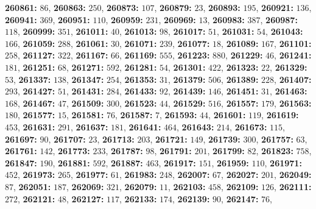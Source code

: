 \textsf{\bfseries 260861:} $86$, \textsf{\bfseries 260863:} $250$, \textsf{\bfseries 260873:} $107$, \textsf{\bfseries 260879:} $23$, \textsf{\bfseries 260893:} $195$, \textsf{\bfseries 260921:} $136$, \textsf{\bfseries 260941:} $369$, \textsf{\bfseries 260951:} $110$, \textsf{\bfseries 260959:} $231$, \textsf{\bfseries 260969:} $13$, \textsf{\bfseries 260983:} $387$, \textsf{\bfseries 260987:} $118$, \textsf{\bfseries 260999:} $351$, \textsf{\bfseries 261011:} $40$, \textsf{\bfseries 261013:} $98$, \textsf{\bfseries 261017:} $51$, \textsf{\bfseries 261031:} $54$, \textsf{\bfseries 261043:} $166$, \textsf{\bfseries 261059:} $288$, \textsf{\bfseries 261061:} $30$, \textsf{\bfseries 261071:} $239$, \textsf{\bfseries 261077:} $18$, \textsf{\bfseries 261089:} $167$, \textsf{\bfseries 261101:} $258$, \textsf{\bfseries 261127:} $322$, \textsf{\bfseries 261167:} $66$, \textsf{\bfseries 261169:} $555$, \textsf{\bfseries 261223:} $880$, \textsf{\bfseries 261229:} $46$, \textsf{\bfseries 261241:} $181$, \textsf{\bfseries 261251:} $68$, \textsf{\bfseries 261271:} $592$, \textsf{\bfseries 261281:} $54$, \textsf{\bfseries 261301:} $422$, \textsf{\bfseries 261323:} $22$, \textsf{\bfseries 261329:} $53$, \textsf{\bfseries 261337:} $138$, \textsf{\bfseries 261347:} $254$, \textsf{\bfseries 261353:} $31$, \textsf{\bfseries 261379:} $506$, \textsf{\bfseries 261389:} $228$, \textsf{\bfseries 261407:} $293$, \textsf{\bfseries 261427:} $51$, \textsf{\bfseries 261431:} $284$, \textsf{\bfseries 261433:} $92$, \textsf{\bfseries 261439:} $146$, \textsf{\bfseries 261451:} $31$, \textsf{\bfseries 261463:} $168$, \textsf{\bfseries 261467:} $47$, \textsf{\bfseries 261509:} $300$, \textsf{\bfseries 261523:} $44$, \textsf{\bfseries 261529:} $516$, \textsf{\bfseries 261557:} $179$, \textsf{\bfseries 261563:} $180$, \textsf{\bfseries 261577:} $15$, \textsf{\bfseries 261581:} $76$, \textsf{\bfseries 261587:} $7$, \textsf{\bfseries 261593:} $44$, \textsf{\bfseries 261601:} $119$, \textsf{\bfseries 261619:} $453$, \textsf{\bfseries 261631:} $291$, \textsf{\bfseries 261637:} $181$, \textsf{\bfseries 261641:} $464$, \textsf{\bfseries 261643:} $214$, \textsf{\bfseries 261673:} $115$, \textsf{\bfseries 261697:} $90$, \textsf{\bfseries 261707:} $23$, \textsf{\bfseries 261713:} $203$, \textsf{\bfseries 261721:} $149$, \textsf{\bfseries 261739:} $300$, \textsf{\bfseries 261757:} $63$, \textsf{\bfseries 261761:} $142$, \textsf{\bfseries 261773:} $233$, \textsf{\bfseries 261787:} $98$, \textsf{\bfseries 261791:} $201$, \textsf{\bfseries 261799:} $82$, \textsf{\bfseries 261823:} $758$, \textsf{\bfseries 261847:} $190$, \textsf{\bfseries 261881:} $592$, \textsf{\bfseries 261887:} $463$, \textsf{\bfseries 261917:} $151$, \textsf{\bfseries 261959:} $110$, \textsf{\bfseries 261971:} $452$, \textsf{\bfseries 261973:} $265$, \textsf{\bfseries 261977:} $61$, \textsf{\bfseries 261983:} $248$, \textsf{\bfseries 262007:} $67$, \textsf{\bfseries 262027:} $201$, \textsf{\bfseries 262049:} $87$, \textsf{\bfseries 262051:} $187$, \textsf{\bfseries 262069:} $321$, \textsf{\bfseries 262079:} $11$, \textsf{\bfseries 262103:} $458$, \textsf{\bfseries 262109:} $126$, \textsf{\bfseries 262111:} $272$, \textsf{\bfseries 262121:} $48$, \textsf{\bfseries 262127:} $117$, \textsf{\bfseries 262133:} $174$, \textsf{\bfseries 262139:} $90$, \textsf{\bfseries 262147:} $76$, 
